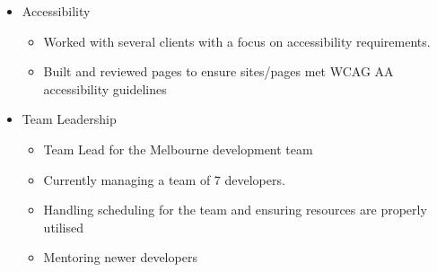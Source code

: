\documentclass[11pt,a4paper,sans]{moderncv}        %
\begin{document}
{\begin{itemize}
\begin{itemize}
          \item Helped start and build a multi-purpose Gulp based build system for use on a wide variety of projects.
          \item Integrated a wide number of common build tasks (SASS/Babel/HTML tempting/Testing) into a single common project which could be used for almost any project
        \end{itemize}
      \item Accessibility
      \begin{itemize}
        \item Worked with several clients with a focus on accessibility requirements.
        \item Built and reviewed pages to ensure sites/pages met WCAG AA accessibility guidelines
      \end{itemize}
      \item Team Leadership
        \begin{itemize}
          \item Team Lead for the Melbourne development team
          \item Currently managing a team of 7 developers.
          \item Handling scheduling for the team and ensuring resources are properly utilised
          \item Mentoring newer developers
        \end{itemize}
      \end{itemize}}
\end{document}
